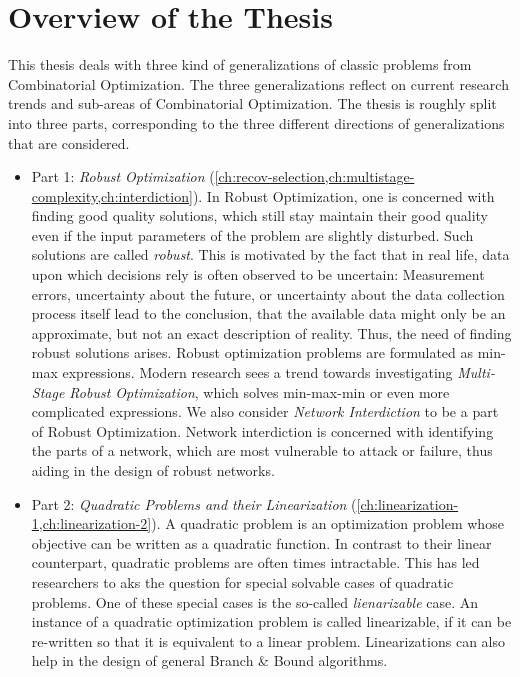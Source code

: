 \section{Overview of the Thesis}

This thesis deals with three kind of generalizations of classic problems from Combinatorial Optimization. 
The three generalizations reflect on current research trends and sub-areas of Combinatorial Optimization. 
The thesis is roughly split into three parts, corresponding to the three different directions of generalizations that are considered.

\begin{itemize}
\item Part 1: \emph{Robust Optimization} (\cref{ch:recov-selection,ch:multistage-complexity,ch:interdiction}). In Robust Optimization, one is concerned with finding good quality solutions, 
which still stay maintain their good quality even if the input parameters of the problem are slightly disturbed. Such solutions are called \emph{robust}.
This is motivated by the fact that in real life, data upon which decisions rely is often observed to be uncertain: 
Measurement errors, uncertainty about the future, or uncertainty about the data collection process itself lead to the conclusion, that the available data might only be an approximate, but not an exact description of reality. Thus, the need of finding robust solutions arises. Robust optimization problems are formulated as min-max expressions. Modern research sees a trend towards investigating \emph{Multi-Stage Robust Optimization}, which solves min-max-min or even more complicated expressions. We also consider \emph{Network Interdiction} to be a part of Robust Optimization. Network interdiction is concerned with identifying the parts of a network, which are most vulnerable to attack or failure, thus aiding in the design of robust networks.

\item Part 2: \emph{Quadratic Problems and their Linearization}  (\cref{ch:linearization-1,ch:linearization-2}). 
A quadratic problem is an optimization problem whose objective can be written as a quadratic function. 
In contrast to their linear counterpart, quadratic problems are often times intractable. 
This has led researchers to aks the question for special solvable cases of quadratic problems. One of these special cases is the so-called \emph{lienarizable} case. 
An instance of a quadratic optimization problem is called linearizable, if it can be re-written so that it is equivalent to a linear problem. Linearizations can also help in the design of general Branch \& Bound algorithms. 


\end{itemize}
